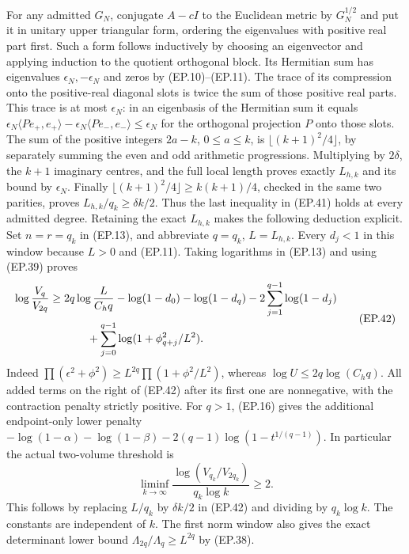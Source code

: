 \documentclass[11pt]{article}
\begin{document}
For any admitted $G_N$, conjugate $A-cI$ to the Euclidean metric
by $G_N^{1/2}$ and put it in unitary upper triangular form, ordering
the eigenvalues with positive real part first. Such a form follows
inductively by choosing an eigenvector and applying induction to
the quotient orthogonal block. Its Hermitian sum has eigenvalues
$\epsilon_N,-\epsilon_N$ and zeros by (EP.10)--(EP.11).
The trace of its compression onto the positive-real diagonal slots
is twice the sum of those positive real parts. This trace is at
most $\epsilon_N$: in an eigenbasis of the Hermitian sum it equals
$\epsilon_N\langle P e_+,e_+\rangle
-\epsilon_N\langle P e_-,e_-\rangle\le\epsilon_N$ for the
orthogonal projection $P$ onto those slots.
The sum of the positive integers $2a-k$, $0\le a\le k$, is
$\lfloor(k+1)^2/4\rfloor$, by separately summing the even and odd
arithmetic progressions. Multiplying by $2\delta$, the $k+1$
imaginary centres, and the full local length proves exactly $L_{h,k}$
and its bound by $\epsilon_N$. Finally
$\lfloor(k+1)^2/4\rfloor\ge k(k+1)/4$, checked in the same two
parities, proves $L_{h,k}/q_k\ge\delta k/2$.
Thus the last inequality in (EP.41) holds at every admitted degree. Retaining the
exact $L_{h,k}$ makes the following deduction explicit. Set $n=r=q_k$
in (EP.13), and abbreviate $q=q_k$, $L=L_{h,k}$.
Every $d_j<1$ in this window because $L>0$ and (EP.11).
Taking logarithms in (EP.13) and using (EP.39) proves
\[
 \begin{split}
 \log\frac{V_q}{V_{2q}}
 &\ge2q\log\frac{L}{C_hq}
 -\log(1-d_0)-\log(1-d_q)-2\sum_{j=1}^{q-1}\log(1-d_j)\\
 &\hspace{12mm}+\sum_{j=0}^{q-1}\log(1+\phi_{q+j}^2/L^2).
 \end{split}\tag{EP.42}
\]
Indeed $\prod(\epsilon^2+\phi^2)\ge
L^{2q}\prod(1+\phi^2/L^2)$, whereas
$\log U\le2q\log(C_hq)$. All added terms on the right of
(EP.42) after its first one are nonnegative, with the contraction
penalty strictly positive. For $q>1$, (EP.16) gives the additional
endpoint-only lower penalty
$-\log(1-\alpha)-\log(1-\beta)
-2(q-1)\log(1-t^{1/(q-1)})$.
In particular the actual two-volume threshold is
\[
 \boxed{\liminf_{k\to\infty}
 \frac{\log(V_{q_k}/V_{2q_k})}{q_k\log k}\ge2.}\tag{EP.43}
\]
This follows by replacing $L/q_k$ by $\delta k/2$ in (EP.42)
and dividing by $q_k\log k$. The constants are independent of $k$.
The first norm window also gives the exact determinant lower bound
$\Lambda_{2q}/\Lambda_q\ge L^{2q}$ by (EP.38).
\end{document}
